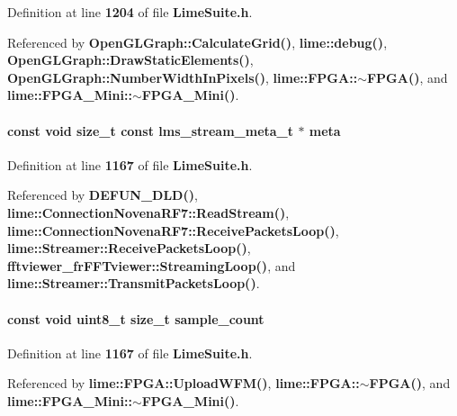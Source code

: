 Definition at line {\bf 1204} of file {\bf Lime\+Suite.\+h}.



Referenced by {\bf Open\+G\+L\+Graph\+::\+Calculate\+Grid()}, {\bf lime\+::debug()}, {\bf Open\+G\+L\+Graph\+::\+Draw\+Static\+Elements()}, {\bf Open\+G\+L\+Graph\+::\+Number\+Width\+In\+Pixels()}, {\bf lime\+::\+F\+P\+G\+A\+::$\sim$\+F\+P\+G\+A()}, and {\bf lime\+::\+F\+P\+G\+A\+\_\+\+Mini\+::$\sim$\+F\+P\+G\+A\+\_\+\+Mini()}.

\paragraph[{meta}]{\setlength{\rightskip}{0pt plus 5cm}const {\bf void} size\+\_\+t const {\bf lms\+\_\+stream\+\_\+meta\+\_\+t} $\ast$ meta}\label{group__FN__STREAM_ga98712045602c817c3807ce704b135f88}


Definition at line {\bf 1167} of file {\bf Lime\+Suite.\+h}.



Referenced by {\bf D\+E\+F\+U\+N\+\_\+\+D\+L\+D()}, {\bf lime\+::\+Connection\+Novena\+R\+F7\+::\+Read\+Stream()}, {\bf lime\+::\+Connection\+Novena\+R\+F7\+::\+Receive\+Packets\+Loop()}, {\bf lime\+::\+Streamer\+::\+Receive\+Packets\+Loop()}, {\bf fftviewer\+\_\+fr\+F\+F\+Tviewer\+::\+Streaming\+Loop()}, and {\bf lime\+::\+Streamer\+::\+Transmit\+Packets\+Loop()}.

\paragraph[{sample\+\_\+count}]{\setlength{\rightskip}{0pt plus 5cm}const {\bf void} uint8\+\_\+t size\+\_\+t sample\+\_\+count}\label{group__FN__STREAM_ga072869ef257c91ea95fe774cdbb4942e}


Definition at line {\bf 1167} of file {\bf Lime\+Suite.\+h}.



Referenced by {\bf lime\+::\+F\+P\+G\+A\+::\+Upload\+W\+F\+M()}, {\bf lime\+::\+F\+P\+G\+A\+::$\sim$\+F\+P\+G\+A()}, and {\bf lime\+::\+F\+P\+G\+A\+\_\+\+Mini\+::$\sim$\+F\+P\+G\+A\+\_\+\+Mini()}.

